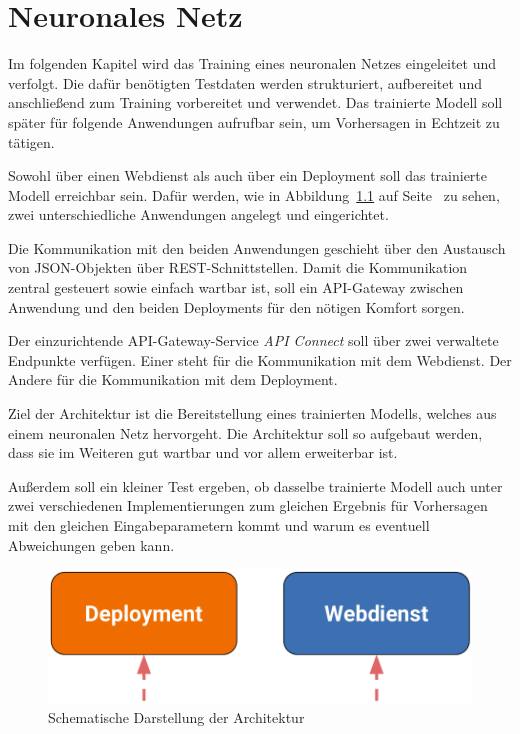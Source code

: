 \chapter{Neuronales Netz}
\label{ch:neuronalesNetz}
Im folgenden Kapitel wird das Training eines neuronalen Netzes eingeleitet und verfolgt. Die dafür benötigten Testdaten
werden strukturiert, aufbereitet und anschließend zum Training vorbereitet und verwendet. Das trainierte Modell soll
später für folgende Anwendungen aufrufbar sein, um Vorhersagen in Echtzeit zu tätigen.

Sowohl über einen Webdienst als auch über ein Deployment soll das trainierte Modell erreichbar sein. Dafür werden, wie
in Abbildung~\ref{fig:schematische_architektur} auf Seite~\pageref{fig:schematische_architektur} zu sehen, zwei
unterschiedliche Anwendungen angelegt und eingerichtet.

Die Kommunikation mit den beiden Anwendungen geschieht über den Austausch von JSON-Objekten über REST-Schnittstellen.
Damit die Kommunikation zentral gesteuert sowie einfach wartbar ist, soll ein API-Gateway zwischen Anwendung und den
beiden Deployments für den nötigen Komfort sorgen.

Der einzurichtende API-Gateway-Service \textit{API Connect} soll über zwei verwaltete Endpunkte verfügen. Einer steht
für die Kommunikation mit dem Webdienst. Der Andere für die Kommunikation mit dem Deployment.

Ziel der Architektur ist die Bereitstellung eines trainierten Modells, welches aus einem neuronalen Netz hervorgeht. Die
Architektur soll so aufgebaut werden, dass sie im Weiteren gut wartbar und vor allem erweiterbar ist.

Außerdem soll ein kleiner Test ergeben, ob dasselbe trainierte Modell auch unter zwei verschiedenen Implementierungen
zum gleichen Ergebnis für Vorhersagen mit den gleichen Eingabeparametern kommt und warum es eventuell Abweichungen geben
kann.

\begin{figure}[h]
    \centering
    \includegraphics[scale=0.5]{images/kapitel_3/architektur_schematisch.pdf}
    \caption{Schematische Darstellung der Architektur}
    \label{fig:schematische_architektur}
\end{figure}
